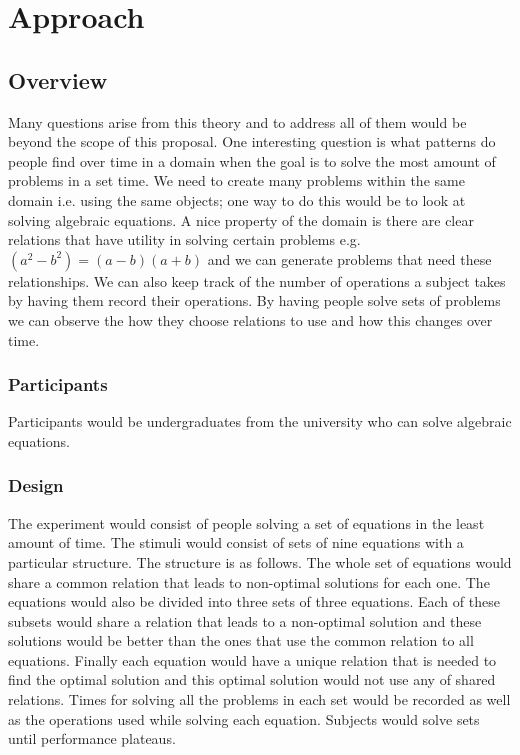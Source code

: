 \documentclass[doc]{apa}%
\begin{document}
\section{Approach}
\subsection{Overview}
Many questions arise from this theory and to address all of them would
be beyond the scope of this proposal.  One interesting question is
what patterns do people find over time in a domain when the goal is to
solve the most amount of problems in a set time.  We need to create many problems
within the same domain i.e. using the same objects; one way to do this
would be to look at solving algebraic equations.  A nice property of
the domain is there are clear relations that have utility in solving
certain problems e.g. $(a^2-b^2)=(a-b)(a+b)$ and we can generate
problems that need these relationships.  We can also keep track
of the number of operations a subject takes by having them record
their operations.  By having people solve sets of problems we can
observe the how they choose relations to use and how this changes over time.

\subsubsection{Participants}
Participants would be undergraduates from the university who can solve algebraic equations.  
\subsubsection{Design}
The experiment would consist of people solving a set of equations in
the least amount of time.  The
stimuli would consist of sets of nine equations with a particular
structure.  The structure is as follows.  The whole set of equations
would share a common relation that leads to non-optimal solutions for
each one.  The equations would also be divided into three sets of
three equations.  Each of these subsets would share a relation that
leads to a non-optimal solution and these solutions would be better
than the
ones that use the common relation to all equations.  Finally each
equation would have a unique relation that is needed to find the
optimal solution and this optimal solution would not use any of shared
relations.  Times for solving all the problems in each set would be
recorded as well as the operations used while solving each equation.
Subjects would solve sets until performance plateaus.
\end{document}
